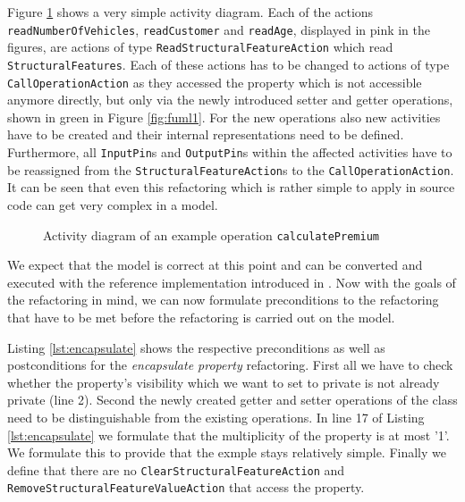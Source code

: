 \documentclass{llncs}
\begin{document}
Figure \ref{fig:calculatePremiumRef} shows a very
simple activity diagram. Each of the actions \texttt{read\-Number\-Of\-Vehicles}, \texttt{read\-Customer} and
\texttt{readAge}, displayed in pink in the figures, are actions of type \texttt{Read\-Structural\-Feature\-Action} which read \texttt{Structural\-Features}. 
Each of these actions has to be changed to actions of type \texttt{Call\-Operation\-Action} as they
accessed the property which is not accessible anymore directly, but only via the newly introduced setter and getter operations,
shown in green in Figure \ref{fig:fuml1}. For the new operations also new activities have to be created and their internal 
representations need to be defined. Furthermore, all \texttt{InputPin}s and \texttt{OutputPin}s within the affected 
activities have to be reassigned from the \texttt{Structural\-Feature\-Action}s to the \texttt{Call\-Operation\-Action}.
It can be seen that even this refactoring which is rather simple to apply in source code can get very complex in a model.

\begin{figure}[h!t]
 \centering
 \caption{Activity diagram of an example operation \texttt{calculatePremium}}
 \label{fig:calculatePremiumRef}
\end{figure}

We expect that the model is correct at this point and can be converted and executed with the reference implementation introduced in 
\cite{DBLP:conf/models/MayerhoferLK12}. Now with the goals of the refactoring in mind, we can now formulate preconditions to the 
refactoring that have to be met before the refactoring is carried out on the model. 

Listing \ref{lst:encapsulate} shows the respective preconditions as well as postconditions for the \textit{encapsulate property} 
refactoring. First all we have to check whether the property's visibility which we want to set to private is not already private 
(line 2). Second the newly created getter and setter operations of the class need to be distinguishable from the existing 
operations. In line 17 of Listing \ref{lst:encapsulate} we formulate that the multiplicity of the property is at most '1'. We 
formulate this to provide that the exmple stays relatively simple. Finally we define that there are no \texttt{Clear\-Structural\-Feature\-Action} and 
\texttt{Remove\-Structural\-Feature\-Value\-Action} that access the property.
\end{document}
